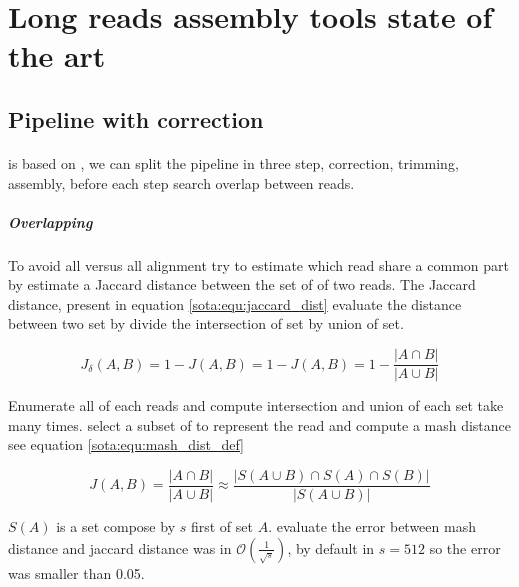 \documentclass[main]{subfiles}
\begin{document}
\chapter{Long reads assembly tools state of the art}

\section{Pipeline with correction}

\subsubsection{\canu} \label{subsubsec:sota:canu}

\canu is based on  \cite{celera_first, celera_second}, we can split the \canu pipeline in three step, correction, trimming, assembly, before each step \canu search overlap between reads.

\paragraph{Overlapping}

To avoid all versus all alignment \mhap try to estimate which read share a common part by estimate a Jaccard distance between the set of \kmers of two reads. The Jaccard distance, present in equation \ref{sota:equ:jaccard_dist} evaluate the distance between two set by divide the intersection of set by union of set.

\begin{equation}
J_{\delta}(A,B) = 1 - J(A,B) = 1 -  J(A,B) = 1 - \frac{|A \cap B|}{|A \cup B|}
\label{sota:equ:jaccard_dist}
\end{equation}

Enumerate all \kmers of each reads and compute intersection and union of each set take many times. \mhap select a subset of \kmers to represent the read and compute a mash distance \cite{mash_distance} see equation \ref{sota:equ:mash_dist_def} 

\begin{equation}
J(A,B) = \frac{|A \cap B|}{|A \cup B|} \approx \frac{|S(A \cup B) \cap S(A) \cap S(B)|}{|S(A \cup B)|}
\label{sota:equ:mash_dist_def}
\end{equation}

$S(A)$ is a \kmers set compose by $s$ first \kmers of set $A$. \citeauthor{mash_distance} evaluate the error between mash distance and jaccard distance was in $\mathcal{O}(\frac{1}{\sqrt{s}})$, by default in \mhap $s=512$ so the error was smaller than 0.05.
\end{document}
